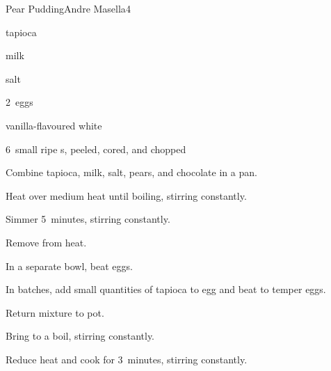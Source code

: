 \begin{recipe}{Pear Pudding}{Andre Masella}{4}

\begin{ingredients}
\item \C{\half} tapioca
\item {} milk
\item \tp{\quarter} salt
\item 2~eggs
\item {} vanilla-flavoured white 
\item 6~small ripe s, peeled, cored, and chopped
\end{ingredients}

\begin{directions}
\item Combine tapioca, milk, salt, pears, and chocolate in a pan.
\item Heat over medium heat until boiling, stirring constantly.
\item Simmer 5~minutes, stirring constantly.
\item Remove from heat.
\item In a separate bowl, beat eggs.
\item In batches, add small quantities of tapioca to egg and beat to temper eggs.
\item Return mixture to pot.
\item Bring to a boil, stirring constantly.
\item Reduce heat and cook for 3~minutes, stirring constantly.
\end{directions}

\end{recipe}
